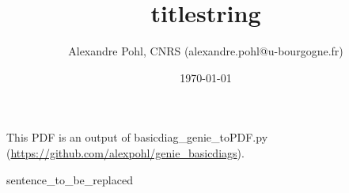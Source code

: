 \documentclass[a4paper,12pt]{scrartcl}
\begin{document}
\title{titlestring}
\author{Alexandre Pohl, CNRS (alexandre.pohl@u-bourgogne.fr)}
\date{\today}
\maketitle

\listoffigures

\clearpage

This PDF is an output of basicdiag_genie_toPDF.py (\url{https://github.com/alexpohl/genie_basicdiags}). \\


\begin{flushleft}
sentence_to_be_replaced
\end{flushleft}

\clearpage

\end{document}

